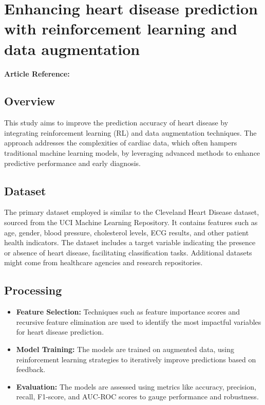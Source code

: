 \section{Enhancing heart disease prediction with reinforcement learning and data augmentation}
\textbf{Article Reference:} \cite{article_5}

\subsection*{Overview}
This study aims to improve the prediction accuracy of heart disease by integrating reinforcement learning (RL) and data augmentation techniques. The approach addresses the complexities of cardiac data, which often hampers traditional machine learning models, by leveraging advanced methods to enhance predictive performance and early diagnosis.

\subsection*{Dataset}
The primary dataset employed is similar to the Cleveland Heart Disease dataset, sourced from the UCI Machine Learning Repository. It contains features such as age, gender, blood pressure, cholesterol levels, ECG results, and other patient health indicators. The dataset includes a target variable indicating the presence or absence of heart disease, facilitating classification tasks. Additional datasets might come from healthcare agencies and research repositories.

\subsection*{Processing}
\begin{itemize}
    \item \textbf{Feature Selection:} Techniques such as feature importance scores and recursive feature elimination are used to identify the most impactful variables for heart disease prediction.
    \item \textbf{Model Training:} The models are trained on augmented data, using reinforcement learning strategies to iteratively improve predictions based on feedback.
    \item \textbf{Evaluation:} The models are assessed using metrics like accuracy, precision, recall, F1-score, and AUC-ROC scores to gauge performance and robustness.
\end{itemize}

